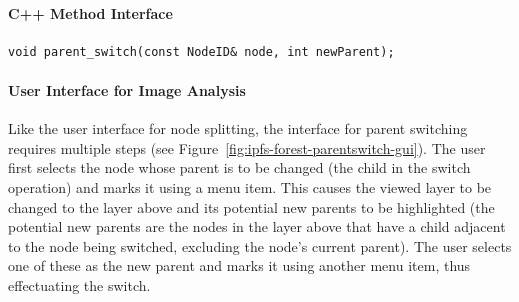 \paragraph{C++ Method Interface}

\begin{lstlisting}[style=Prototype]
void parent_switch(const NodeID& node, int newParent);
\end{lstlisting}

\paragraph{User Interface for Image Analysis}

Like the user interface for node splitting, the interface for parent switching requires multiple steps (see Figure~\ref{fig:ipfs-forest-parentswitch-gui}). The user first selects the node whose parent is to be changed (the child in the switch operation) and marks it using a menu item. This causes the viewed layer to be changed to the layer above and its potential new parents to be highlighted (the potential new parents are the nodes in the layer above that have a child adjacent to the node being switched, excluding the node's current parent). The user selects one of these as the new parent and marks it using another menu item, thus effectuating the switch.

